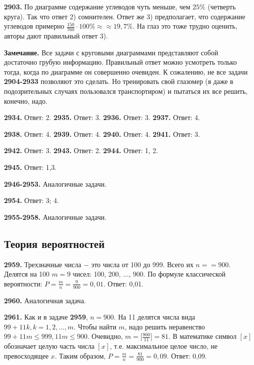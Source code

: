 \textbf{2903.} По диаграмме содержание углеводов чуть меньше, чем $25\%$ (четверть круга). Так что ответ 2) сомнителен. Ответ же 3) предполагает, что содержание углеводов примерно $\frac{150}{760}\cdot100\%\approx$\newline$\approx19,7\%$. На глаз это тоже трудно оценить, авторы дают правильный ответ 3).

\textbf{Замечание.} Все задачи с круговыми диаграммами представляют собой достаточно грубую информацию. Правильный ответ можно усмотреть только тогда, когда по диаграмме он совершенно очевиден. К сожалению, не все задачи \textbf{2904-2933} позволяют это сделать. Но тренировать свой глазомер (я даже в подозрительных случаях пользовался транспортиром) и пытаться их все решить, конечно, надо.

\textbf{2934.} Ответ: 2. \textbf{2935.} Ответ: 3. \textbf{2936.} Ответ: 3. \textbf{2937.} Ответ: 4.

\textbf{2938.} Ответ: 4. \textbf{2939.} Ответ: 4. \textbf{2940.} Ответ: 4. \textbf{2941.} Ответ: 3.

 \textbf{2942.} Ответ: 3. \textbf{2943.} Ответ: 2. \textbf{2944.} Ответ: 1, 2.

\textbf{2945.} Ответ: 1,3. 

\textbf{2946-2953.} Аналогичные задачи.

\textbf{2954.} Ответ: 3; 4.

\textbf{2955-2958.} Аналогичные задачи.

\subsection{Теория вероятностей}

\textbf{2959.} Трехзначные числа $-$ это числа от 100 до 999. Всего их $n=$\newline$=900.$ Делятся на 100 $m=9$ чисел: 100, 200, ..., 900. По формуле классической вероятности: $P=\frac{m}{n}=\frac{9}{900}=0,01.$ \newline \null \hspace*{\fill} Ответ: 0,01. 

\textbf{2960.} Аналогичная задача.

\textbf{2961.} Как и в задаче \textbf{2959}, $n=900$. На 11 делятся числа вида $99+11k, k=1, 2, \dots, m.$ Чтобы найти $m$, надо решить неравенство $99+11m\leq999, 11m\leq900.$ Очевидно, $m=\bigg[\frac{900}{11}\bigg]=81.$ В математике символ $[x]$ обозначает целую часть числа $[x]$, т.е. максимальное целое число, не превосходящее $x$. Таким образом, $P = \frac{m}{n}=\frac{81}{900}=0,09.$ \newline \null \hspace*{\fill} Ответ: 0,09. 

